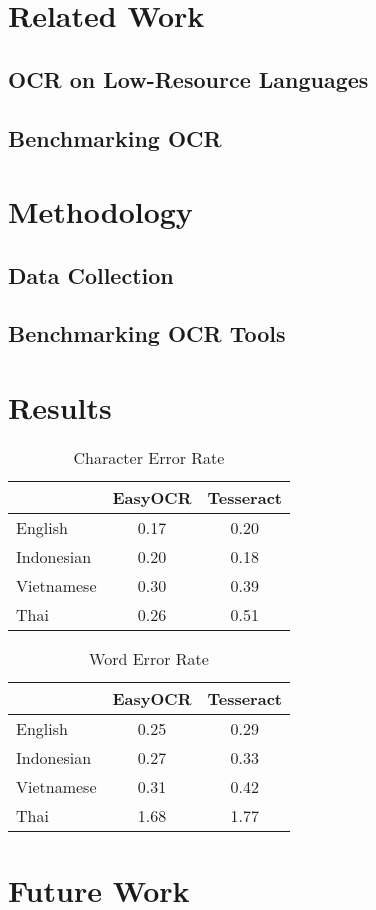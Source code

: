 \documentclass[12pt,oneside]{memoir}
\begin{document}
\chapter{Related Work}
\section{OCR on Low-Resource Languages}
\parencite{ignat-etal-2022}
\section{Benchmarking OCR}

\chapter{Methodology}

\section{Data Collection}

\section{Benchmarking OCR Tools}

\chapter{Results}

\begin{table}[h]
    \centering
    \begin{tabular}{|l|c|c|}
        \hline
        & EasyOCR & Tesseract \\
        \hline
        English & 0.17 & 0.20\\
        Indonesian & 0.20& 0.18\\
        Vietnamese & 0.30& 0.39\\
        Thai & 0.26 & 0.51\\
        \hline
    \end{tabular}
    \caption{Character Error Rate}
\end{table}

\begin{table}[h]
    \centering
    \begin{tabular}{|l|c|c|}
        \hline
        & EasyOCR & Tesseract \\
        \hline
        English & 0.25 & 0.29\\
        Indonesian & 0.27& 0.33\\
        Vietnamese & 0.31& 0.42\\
        Thai & 1.68 & 1.77\\
        \hline
    \end{tabular}
    \caption{Word Error Rate}
\end{table}

\chapter{Future Work}

\printbibliography[title={References}]
\end{document}
